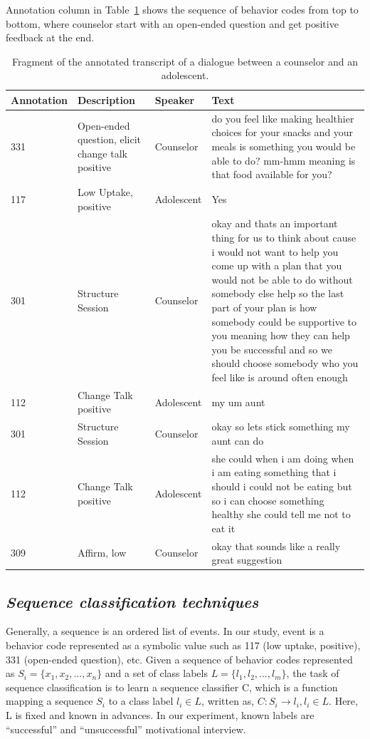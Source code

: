\documentclass{amia}
\begin{document}
Annotation column in Table~\ref{tab:anno_examp} shows the sequence of behavior codes from top to bottom, where counselor start with an open-ended question and get positive feedback at the end. \\

\begin{table}[h]
\caption{Fragment of the annotated transcript of a dialogue between a counselor and an adolescent.}    
\label{tab:anno_examp}
\centering
\begin{tabular}{|l|p{3.6cm}|l|p{8cm}|}
\hline
Annotation  & Description & Speaker & Text \\\hline
331 &	Open-ended question, elicit change talk positive &	Counselor &	do you feel like making healthier choices for your snacks and your meals is something you would be able to do? mm-hmm meaning is that food available for you? \\\hline
117 &	Low Uptake, positive	& Adolescent &	Yes \\\hline
301 &	Structure Session	& Counselor &	okay and thats an important thing for us to think about cause i would not want to help you come up with a plan that you would not be able to do without somebody else help so the last part of your plan is how somebody could be supportive to you meaning how they can help you be successful and so we should choose somebody who you feel like is around often enough \\\hline
112 &	Change Talk positive	& Adolescent &	my um aunt \\\hline
301 &	Structure Session	& Counselor &	okay so lets stick something my aunt can do \\\hline
112 &	Change Talk positive &	Adolescent &	she could when i am doing when i am eating something that i should i could not be eating but so i can choose something healthy she could tell me not to eat it \\\hline
309 &	Affirm, low &	Counselor &	okay that sounds like a really great suggestion \\\hline
\end{tabular}
\end{table}  

\subsection*{\textit{Sequence classification techniques}}
Generally, a sequence is an ordered list of events. In our study, event is a behavior code represented as a symbolic value such as 117 (low uptake, positive), 331 (open-ended question), etc.  Given a sequence of behavior codes represented as $S_i = \{x_1, x_2,...,x_n\}$ and a set of class labels $L = \{l_1, l_2,...,l_m\}$, the task of sequence classification is to learn a sequence classifier C, which is a function mapping a sequence $S_i$ to a class label $l_i \in L$, written as, $C : S_i \to l_i, l_i \in L$. Here, L is fixed and known in advances. In our experiment, known labels are ``successful'' and ``unsuccessful'' motivational interview. 
\end{document}
